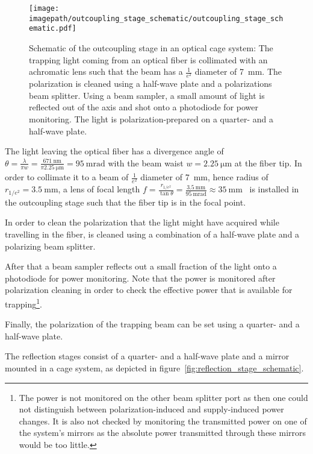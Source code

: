 \begin{figure}
    \centering
    \texttt{[image: \\imagepath/outcoupling\_stage\_schematic/outcoupling\_stage\_schematic.pdf]}
    \caption{Schematic of the outcoupling stage in an optical cage system: The trapping light coming from an optical fiber is collimated with an achromatic lens such that the beam has a $\frac{1}{e^2}$ diameter of \SI{7}{\milli\meter}. The polarization is cleaned using a half-wave plate and a polarizations beam splitter. Using a beam sampler, a small amount of light is reflected out of the axis and shot onto a photodiode for power monitoring. The light is polarization-prepared on a quarter- and a half-wave plate.}
    \label{fig:outcoupling_stage_schematic}
\end{figure}

The light leaving the optical fiber has a divergence angle of $\theta = \frac{\lambda}{\pi w} = \frac{\SI{671}{\nano\meter}}{\pi\SI{2.25}{\micro\meter}} = \SI{95}{\milli\radian}$ with the beam waist $w = \SI{2.25}{\micro\meter}$ at the fiber tip. In order to collimate it to a beam of $\frac{1}{e^2}$ diameter of \SI{7}{\milli\meter}, hence radius of $r_{1/e^2} = \SI{3.5}{\milli\meter}$, a lens of focal length $f = \frac{r_{1/e^2}}{\tan \theta} = \frac{\SI{3.5}{\milli\meter}}{\SI{95}{\milli\radian}} \approx \SI{35}{\milli\meter}$~\cite{noauthor_collimated_2021} is installed in the outcoupling stage such that the fiber tip is in the focal point.

In order to clean the polarization that the light might have acquired while travelling in the fiber, is cleaned using a combination of a half-wave plate and a polarizing beam splitter.

After that a beam sampler reflects out a small fraction of the light onto a photodiode for power monitoring. Note that the power is monitored after polarization cleaning in order to check the effective power that is available for trapping\footnote{The power is not monitored on the other beam splitter port as then one could not distinguish between polarization-induced and supply-induced power changes. It is also not checked by monitoring the transmitted power on one of the system's mirrors as the absolute power transmitted through these mirrors would be too little.}.

Finally, the polarization of the trapping beam can be set using a quarter- and a half-wave plate.

The reflection stages consist of a quarter- and a half-wave plate and a mirror mounted in a cage system, as depicted in figure~\ref{fig:reflection_stage_schematic}.

